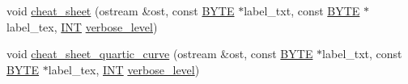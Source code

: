 \begin{DoxyCompactItemize}
\item 
void \mbox{\hyperlink{classsurface__object__with__action_a3607ebff13e6a32d719f5efb3b85fa8b}{cheat\+\_\+sheet}} (ostream \&ost, const \mbox{\hyperlink{galois_8h_ab6cc7b4aeb6ea31aba2b3fbfc83ff5e6}{B\+Y\+TE}} $\ast$label\+\_\+txt, const \mbox{\hyperlink{galois_8h_ab6cc7b4aeb6ea31aba2b3fbfc83ff5e6}{B\+Y\+TE}} $\ast$label\+\_\+tex, \mbox{\hyperlink{galois_8h_a09fddde158a3a20bd2dcadb609de11dc}{I\+NT}} \mbox{\hyperlink{simeon_8_c_a818073fbcc2f439e7c56952f67386122}{verbose\+\_\+level}})
\item 
void \mbox{\hyperlink{classsurface__object__with__action_a7f42e37fc76dd9b6b113e35c2b886b36}{cheat\+\_\+sheet\+\_\+quartic\+\_\+curve}} (ostream \&ost, const \mbox{\hyperlink{galois_8h_ab6cc7b4aeb6ea31aba2b3fbfc83ff5e6}{B\+Y\+TE}} $\ast$label\+\_\+txt, const \mbox{\hyperlink{galois_8h_ab6cc7b4aeb6ea31aba2b3fbfc83ff5e6}{B\+Y\+TE}} $\ast$label\+\_\+tex, \mbox{\hyperlink{galois_8h_a09fddde158a3a20bd2dcadb609de11dc}{I\+NT}} \mbox{\hyperlink{simeon_8_c_a818073fbcc2f439e7c56952f67386122}{verbose\+\_\+level}})
\end{DoxyCompactItemize}
